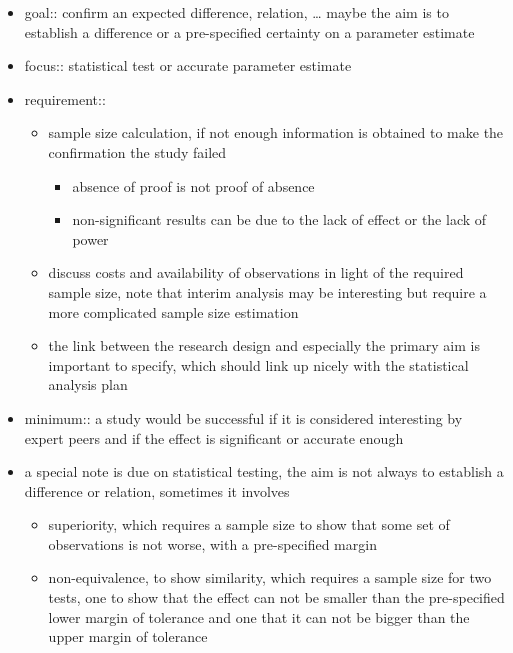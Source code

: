 \documentclass[]{article}
\providecommand{\tightlist}{%
  \setlength{\itemsep}{0pt}\setlength{\parskip}{0pt}}
\begin{document}
\begin{itemize}
\tightlist
\item
  goal:: confirm an expected difference, relation, \ldots{} maybe the
  aim is to establish a difference or a pre-specified certainty on a
  parameter estimate
\item
  focus:: statistical test or accurate parameter estimate
\item
  requirement::

  \begin{itemize}
  \tightlist
  \item
    sample size calculation, if not enough information is obtained to
    make the confirmation the study failed

    \begin{itemize}
    \tightlist
    \item
      absence of proof is not proof of absence
    \item
      non-significant results can be due to the lack of effect or the
      lack of power
    \end{itemize}
  \item
    discuss costs and availability of observations in light of the
    required sample size, note that interim analysis may be interesting
    but require a more complicated sample size estimation
  \item
    the link between the research design and especially the primary aim
    is important to specify, which should link up nicely with the
    statistical analysis plan
  \end{itemize}
\item
  minimum:: a study would be successful if it is considered interesting
  by expert peers and if the effect is significant or accurate enough 
\item
  a special note is due on statistical testing, the aim is not always to
  establish a difference or relation, sometimes it involves

  \begin{itemize}
  \tightlist
  \item
    superiority, which requires a sample size to show that some set of
    observations is not worse, with a pre-specified margin
  \item
    non-equivalence, to show similarity, which requires a sample size
    for two tests, one to show that the effect can not be smaller than
    the pre-specified lower margin of tolerance and one that it can not
    be bigger than the upper margin of tolerance
  \end{itemize}
\end{itemize}
\end{document}
